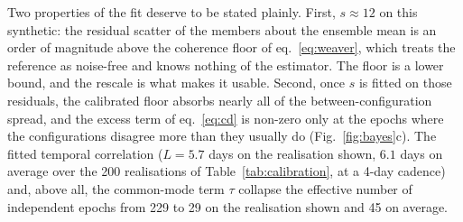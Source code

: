 \documentclass[
  referee]{gji}
\begin{document}
Two properties of the fit deserve to be stated plainly. First,
\(s\approx 12\) on this synthetic: the residual scatter of the members
about the ensemble mean is an order of magnitude above the coherence
floor of eq.~\ref{eq:weaver}, which treats the reference as noise-free
and knows nothing of the estimator. The floor is a lower bound, and the
rescale is what makes it usable. Second, once \(s\) is fitted on those
residuals, the calibrated floor absorbs nearly all of the
between-configuration spread, and the excess term of eq.~\ref{eq:cd} is
non-zero only at the epochs where the configurations disagree more than
they usually do (Fig.~\ref{fig:bayes}c). The fitted temporal correlation
(\(L=5.7\) days on the realisation shown, \(6.1\) days on average over
the 200 realisations of Table~\ref{tab:calibration}, at a 4-day cadence)
and, above all, the common-mode term \(\tau\) collapse the effective
number of independent epochs from 229 to 29 on the realisation shown and
45 on average.
\end{document}
